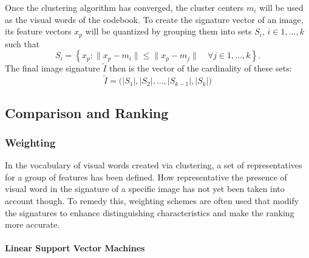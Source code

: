 Once the clustering algorithm has converged, the cluster centers $m_i$ will be
used as the visual words of the codebook. To create the signature vector of an
image, its feature vectors $x_p$ will be quantized by grouping them into sets
$S_i$, $i \in 1, \dots, k$ such that
\begin{equation*}
    S_i = \left\{ x_p : \| x_p - m_{i} \| \leq \| x_p - m_{j} \| \quad \forall j \in 1, \dots, k \right\}.
\end{equation*}
The final image signature $\tilde{I}$ then is the vector of the cardinality of these sets:
\begin{equation*}
    \tilde{I} = \big( |S_1|, |S_2|, \dots, |S_{k-1}|, |S_{k}| \big)
\end{equation*}

\subsection{Comparison and Ranking}\label{sec:anatomy_ranking}

\subsubsection{Weighting}\label{sec:anatomy_ranking_weighting}

In the vocabulary of visual words created via clustering, a set of
representatives for a group of features has been defined. How representative
the presence of visual word in the signature of a specific image has not yet
been taken into account though. To remedy this, weighting schemes are often
used that modify the signatures to enhance distinguishing characteristics and
make the ranking more accurate.

\paragraph{Linear Support Vector Machines}

